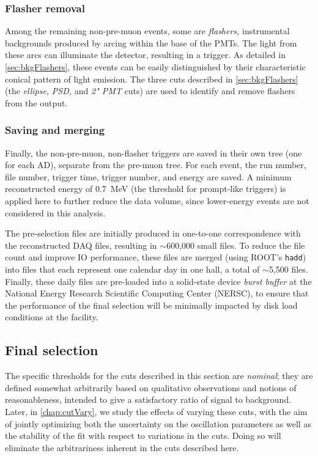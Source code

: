 \documentclass[../thesis.tex]{subfiles}
\begin{document}
\subsubsection{Flasher removal}
\label{sec:selFlashers}

Among the remaining non-pre-muon events, some are \emph{flashers,} instrumental backgrounds produced by arcing within the base of the PMTs. The light from these arcs can illuminate the detector, resulting in a trigger. As detailed in \autoref{sec:bkgFlashers}, these events can be easily distinguished by their characteristic conical pattern of light emission. The three cuts described in \autoref{sec:bkgFlashers} (the \emph{ellipse,} \emph{PSD,} and \emph{2" PMT} cuts) are used to identify and remove flashers from the output.

\subsubsection{Saving and merging}
\label{sec:selMergingOne}

Finally, the non-pre-muon, non-flasher triggers are saved in their own tree (one for each AD), separate from the pre-muon tree. For each event, the run number, file number, trigger time, trigger number, and energy are saved. A minimum reconstructed energy of 0.7~MeV (the threshold for prompt-like triggers) is applied here to further reduce the data volume, since lower-energy events are not considered in this analysis.

The pre-selection files are initially produced in one-to-one correspondence with the reconstructed DAQ files, resulting in $\sim$600,000 small files. To reduce the file count and improve IO performance, these files are merged (using ROOT's \texttt{hadd}) into files that each represent one calendar day in one hall, a total of $\sim$5,500 files. Finally, these daily files are pre-loaded into a solid-state device \emph{burst buffer} at the National Energy Research Scientific Computing Center (NERSC), to ensure that the performance of the final selection will be minimally impacted by disk load conditions at the facility.

\subsection{Final selection}
\label{sec:selFinalSel}

The specific thresholds for the cuts described in this section are \emph{nominal}; they are defined somewhat arbitrarily based on qualitative observations and notions of reasonableness, intended to give a satisfactory ratio of signal to background. Later, in \autoref{chap:cutVary}, we study the effects of varying these cuts, with the aim of jointly optimizing both the uncertainty on the oscillation parameters as well as the stability of the fit with respect to variations in the cuts. Doing so will eliminate the arbitrariness inherent in the cuts described here.
\end{document}
